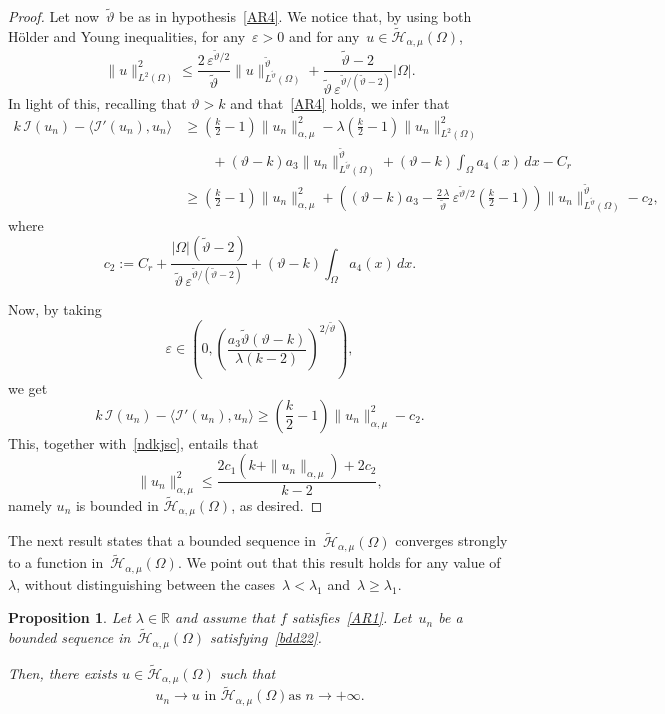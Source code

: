 \documentclass[12pt,a4paper,intlimits,sumlimits]{amsart}
\def \R {\mathbb{R}}
\theoremstyle{definition}
\theoremstyle{plain}
\newtheorem{proposition}[definition]{Proposition}
\numberwithin{equation}{section}
\renewcommand{\le}{\leqslant}
\renewcommand{\ge}{\geqslant}
\begin{document}
\begin{proof}
Let now~$\widetilde\vartheta$ be as in hypothesis~\eqref{AR4}. We notice that, by using both H\"older and Young inequalities,
for any~$\varepsilon>0$ and for any~$u\in \widetilde{\mathcal{H}}_{\alpha, \mu}(\Omega)$,
\[
\|u\|^2_{L^2(\Omega)}\le \frac{2\,\varepsilon^{\widetilde\vartheta/2}}{\widetilde\vartheta} \|u\|^{\widetilde\vartheta}_{L^{\widetilde\vartheta}(\Omega)} +\frac{\widetilde\vartheta -2}{\widetilde\vartheta\,\varepsilon^{\widetilde\vartheta/{(\widetilde\vartheta -2)}}} |\Omega|.
\]
In light of this, recalling that $\vartheta>k$ and that~\eqref{AR4} holds, we infer that
\[
\begin{split}
k\, \mathcal I(u_n) -\langle \mathcal I'(u_n), u_n\rangle&\ge\left(\frac{k}{2}-1\right)\|u_n\|^2_{\alpha, \mu}-\lambda\left(\frac{k}{2}-1\right)\|u_n\|^2_{L^2(\Omega)}\\
&\qquad +(\vartheta -k) a_3 \|u_n\|^{\widetilde\vartheta}_{L^{\widetilde\vartheta}(\Omega)} +(\vartheta - k)\int_\Omega a_4(x) \,dx -C_r\\
&\ge\left(\frac{k}{2}-1\right)\|u_n\|^2_{\alpha, \mu} + \left((\vartheta-k)a_3-\frac{2\,\lambda}{\widetilde\vartheta}\,\varepsilon^{\widetilde\vartheta/2}\left(\frac{k}{2}-1 \right)\right)\|u_n\|^{\widetilde\vartheta}_{L^{\widetilde\vartheta}(\Omega)} -c_2,
\end{split}
\]
where
\[
c_2:= C_r +\frac{|\Omega|(\widetilde\vartheta-2)}{\widetilde\vartheta\,\varepsilon^{\widetilde\vartheta/(\widetilde\vartheta-2)}} +(\vartheta - k)\int_\Omega a_4(x) \,dx. 
\]

Now, by taking
\[
\varepsilon\in\left(0, \left(\frac{a_3\widetilde\vartheta (\vartheta-k)}{\lambda(k-2)}\right)^{2/\widetilde\vartheta}\right),
\]
we get
\[
k\, \mathcal I(u_n) -\langle \mathcal I'(u_n), u_n\rangle\ge \left(\frac{k}{2}-1\right)\|u_n\|^2_{\alpha, \mu} -c_2.
\]
This, together with~\eqref{ndkjsc}, entails that 
\[
\|u_n\|^2_{\alpha, \mu}\le \frac{2c_1 (k +\|u_n\|_{\alpha, \mu}) +2c_2}{k-2},
\]
namely $u_n$ is bounded in $\widetilde{\mathcal{H}}_{\alpha, \mu}(\Omega)$, as desired.
\end{proof}

The next result states that a bounded sequence in~$\widetilde{\mathcal{H}}_{\alpha, \mu}(\Omega)$ converges strongly
to a function in~$\widetilde{\mathcal{H}}_{\alpha, \mu}(\Omega)$.
We point out that this result holds for any value of~$\lambda$, without
distinguishing between the cases~$\lambda<\lambda_1$ and~$\lambda\ge\lambda_1$.

\begin{proposition}\label{PropPS22}
Let $\lambda\in\R$ and assume that $f$ satisfies~\eqref{AR1}. Let~$u_n$ be a bounded sequence in~$\widetilde{\mathcal{H}}_{\alpha, \mu}(\Omega)$ satisfying~\eqref{bdd22}.

Then, there exists $u\in\widetilde{\mathcal{H}}_{\alpha, \mu}(\Omega)$ such that
\[
{\mbox{$u_n\to u$ in~$\widetilde{\mathcal{H}}_{\alpha, \mu}(\Omega)$
as~$n\to+\infty$.}}
\]
\end{proposition}
\end{document}
